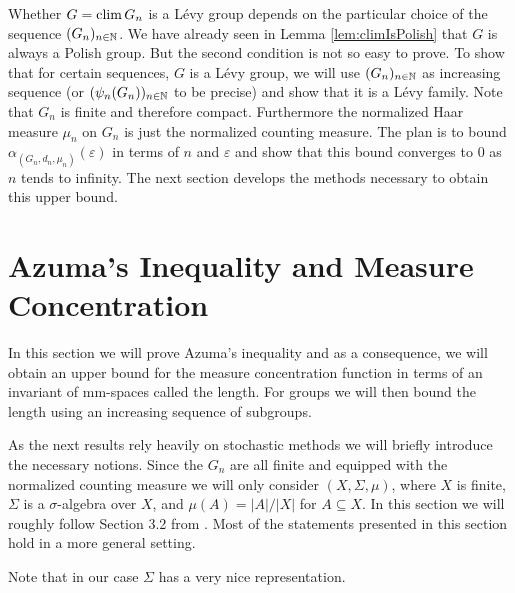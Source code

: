 Whether $G=\operatorname{clim} G_n$ is a L\'evy group depends on the particular choice of the sequence $(G_n)_{n\in\mathbb{N}}$. We have already seen in Lemma \ref{lem:climIsPolish} that $G$ is always a Polish group. But the second condition is not so easy to prove.
To show that for certain sequences, $G$ is a L\'evy group, we will use $(G_n)_{n\in\mathbb{N}}$ as increasing sequence (or $(\psi_n(G_n))_{n\in\mathbb{N}}$ to be precise) and show that it is a L\'evy family. Note that $G_n$ is finite and therefore compact. Furthermore the normalized Haar measure $\mu_n$ on $G_n$ is just the normalized counting measure. The plan is to bound $\alpha_{(G_n,d_n,\mu_n)}(\varepsilon)$ in terms of $n$ and $\varepsilon$ and show that this bound converges to 0 as $n$ tends to infinity. 
The next section develops the methods necessary to obtain this upper bound.
		
		
\section{Azuma's Inequality and Measure Concentration}\label{sec:azema}
In this section we will prove Azuma's inequality and as a consequence, we will obtain an upper bound for the measure concentration function in terms of an invariant of mm-spaces called the length. For groups we will then bound the length using an increasing sequence of subgroups. 

As the next results rely heavily on stochastic methods we will briefly introduce the necessary notions. Since the $G_n$ are all finite and equipped with the normalized counting measure we will only consider  $(X,\Sigma,\mu)$, where $X$ is finite, $\Sigma$ is a $\sigma$-algebra over $X$, and $\mu(A)=|A|/|X|$ for $A\subseteq X$. In this section we will roughly follow Section 3.2 from \cite{AzemaLevy}. Most of the statements presented in this section hold in a more general setting. 

Note that in our case $\Sigma$ has a very nice representation.%
		
